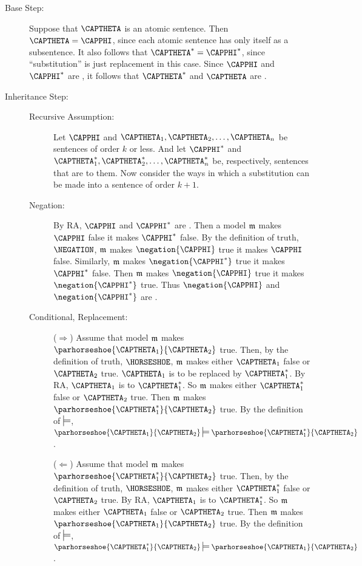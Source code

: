 \begin{PROOF}
\begin{description}
\item[Base Step:] Suppose that $\CAPTHETA$ is an atomic sentence. 
Then $\CAPTHETA=\CAPPHI$, since each atomic sentence has only itself as a subsentence.
It also follows that $\CAPTHETA^*=\CAPPHI^*$, since ``substitution'' is just replacement in this case.
Since $\CAPPHI$ and $\CAPPHI^*$ are , it follows that $\CAPTHETA^*$ and $\CAPTHETA$ are .

\item[Inheritance Step:] \hfill{}
\begin{description}

	\item[Recursive Assumption:] Let $\CAPPHI$ and $\CAPTHETA_1,\CAPTHETA_2,\ldots,\CAPTHETA_{\integer{n}}$ be \GSL{} sentences of order $k$ or less. And let $\CAPPHI^*$ and $\CAPTHETA_1^*,\CAPTHETA_2^*,\ldots,\CAPTHETA_{\integer{n}}^*$ be, respectively, \GSL{} sentences that are  to them. Now consider the ways in which a substitution can be made into a sentence of order $k+1$.
	
	\item[Negation:] By RA, $\CAPPHI$ and $\CAPPHI^*$ are .
	Then a model $\mathfrak{m}$ makes $\CAPPHI$ false \Iff it makes $\CAPPHI^*$ false.
	By the definition of truth, $\NEGATION$, $\mathfrak{m}$ makes $\negation{\CAPPHI}$ true \Iff it makes $\CAPPHI$ false.
	Similarly, $\mathfrak{m}$ makes $\negation{\CAPPHI^*}$ true \Iff it makes $\CAPPHI^*$ false.
	Then $\mathfrak{m}$ makes $\negation{\CAPPHI}$ true \Iff it makes $\negation{\CAPPHI^*}$ true.
	Thus $\negation{\CAPPHI}$ and $\negation{\CAPPHI^*}$ are .

	\item[Conditional, \lhs Replacement:] ($\Rightarrow$) Assume that model $\mathfrak{m}$ makes $\parhorseshoe{\CAPTHETA_1}{\CAPTHETA_2}$ true.
	Then, by the definition of truth, $\HORSESHOE$, $\mathfrak{m}$ makes either $\CAPTHETA_1$ false or $\CAPTHETA_2$ true.
	$\CAPTHETA_1$ is to be replaced by $\CAPTHETA_1^*$.
	By RA, $\CAPTHETA_1$ is \tfe to $\CAPTHETA_1^*$.
	So $\mathfrak{m}$ makes either $\CAPTHETA_1^*$ false or $\CAPTHETA_2$ true.
	Then $\mathfrak{m}$ makes $\parhorseshoe{\CAPTHETA_1^*}{\CAPTHETA_2}$ true.
	By the definition of $\entails$, $\parhorseshoe{\CAPTHETA_1}{\CAPTHETA_2}\entails\parhorseshoe{\CAPTHETA_1^*}{\CAPTHETA_2}$.

	($\Leftarrow$) Assume that model $\mathfrak{m}$ makes $\parhorseshoe{\CAPTHETA_1^*}{\CAPTHETA_2}$ true.
	Then, by the definition of truth, $\HORSESHOE$, $\mathfrak{m}$ makes either $\CAPTHETA_1^*$ false or $\CAPTHETA_2$ true.
	By RA, $\CAPTHETA_1$ is \tfe to $\CAPTHETA_1^*$.
	So $\mathfrak{m}$ makes either $\CAPTHETA_1$ false or $\CAPTHETA_2$ true.
	Then $\mathfrak{m}$ makes $\parhorseshoe{\CAPTHETA_1}{\CAPTHETA_2}$ true.
	By the definition of $\entails$, $\parhorseshoe{\CAPTHETA_1^*}{\CAPTHETA_2}\entails\parhorseshoe{\CAPTHETA_1}{\CAPTHETA_2}$.


\end{description}
\end{description}
\end{PROOF}
